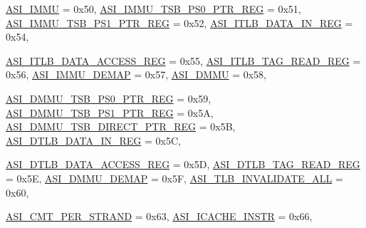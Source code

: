 \begin{DoxyCompactItemize}
\par
\hyperlink{namespaceSparcISA_a6dd43f1311515252b283f56d7095a1f3a337bf91156b14a4b25905f1a0b2f5142}{ASI\_\-IMMU} =  0x50, 
\hyperlink{namespaceSparcISA_a6dd43f1311515252b283f56d7095a1f3a9fe30ba6c52e99c829f793a837aba380}{ASI\_\-IMMU\_\-TSB\_\-PS0\_\-PTR\_\-REG} =  0x51, 
\hyperlink{namespaceSparcISA_a6dd43f1311515252b283f56d7095a1f3a58af1ebeb5420602be796503655d627a}{ASI\_\-IMMU\_\-TSB\_\-PS1\_\-PTR\_\-REG} =  0x52, 
\hyperlink{namespaceSparcISA_a6dd43f1311515252b283f56d7095a1f3ab15563200e5ce30af30ec4aa756b6bc9}{ASI\_\-ITLB\_\-DATA\_\-IN\_\-REG} =  0x54, 
\par
\hyperlink{namespaceSparcISA_a6dd43f1311515252b283f56d7095a1f3adacedf312d74ca082fe306ca99f16537}{ASI\_\-ITLB\_\-DATA\_\-ACCESS\_\-REG} =  0x55, 
\hyperlink{namespaceSparcISA_a6dd43f1311515252b283f56d7095a1f3a784a2431fd585c65b3345a1cdfb87c0f}{ASI\_\-ITLB\_\-TAG\_\-READ\_\-REG} =  0x56, 
\hyperlink{namespaceSparcISA_a6dd43f1311515252b283f56d7095a1f3abebdb32d4c9dbcc9092004d1d7361f88}{ASI\_\-IMMU\_\-DEMAP} =  0x57, 
\hyperlink{namespaceSparcISA_a6dd43f1311515252b283f56d7095a1f3a46474a3165406b7157c198ba554512e2}{ASI\_\-DMMU} =  0x58, 
\par
\hyperlink{namespaceSparcISA_a6dd43f1311515252b283f56d7095a1f3a8db433fb34a04fb3fc15cb4e8cc95fb7}{ASI\_\-DMMU\_\-TSB\_\-PS0\_\-PTR\_\-REG} =  0x59, 
\hyperlink{namespaceSparcISA_a6dd43f1311515252b283f56d7095a1f3a8736fd444e044bedb9bc22dd6938d0ee}{ASI\_\-DMMU\_\-TSB\_\-PS1\_\-PTR\_\-REG} =  0x5A, 
\hyperlink{namespaceSparcISA_a6dd43f1311515252b283f56d7095a1f3ab1f59010cbc6ea0a34bd7a595816c46c}{ASI\_\-DMMU\_\-TSB\_\-DIRECT\_\-PTR\_\-REG} =  0x5B, 
\hyperlink{namespaceSparcISA_a6dd43f1311515252b283f56d7095a1f3a59d36f43c8056ddb8cba9e50bf0c3997}{ASI\_\-DTLB\_\-DATA\_\-IN\_\-REG} =  0x5C, 
\par
\hyperlink{namespaceSparcISA_a6dd43f1311515252b283f56d7095a1f3ac41ca1d1e3c5d22e4d360bd4d74f0c98}{ASI\_\-DTLB\_\-DATA\_\-ACCESS\_\-REG} =  0x5D, 
\hyperlink{namespaceSparcISA_a6dd43f1311515252b283f56d7095a1f3a1d47b44e20a03785b930d704519f876a}{ASI\_\-DTLB\_\-TAG\_\-READ\_\-REG} =  0x5E, 
\hyperlink{namespaceSparcISA_a6dd43f1311515252b283f56d7095a1f3a4e57082a0002e2dda9f475f33629b99e}{ASI\_\-DMMU\_\-DEMAP} =  0x5F, 
\hyperlink{namespaceSparcISA_a6dd43f1311515252b283f56d7095a1f3a326f9af359c2ddbe1ff303fd88202c79}{ASI\_\-TLB\_\-INVALIDATE\_\-ALL} =  0x60, 
\par
\hyperlink{namespaceSparcISA_a6dd43f1311515252b283f56d7095a1f3ada71bc0b88a113aeee3a6f02994f4f20}{ASI\_\-CMT\_\-PER\_\-STRAND} =  0x63, 
\hyperlink{namespaceSparcISA_a6dd43f1311515252b283f56d7095a1f3ad040f6e1aaf59f8c01601da9ea6de3bc}{ASI\_\-ICACHE\_\-INSTR} =  0x66, 

\end{DoxyCompactItemize}
